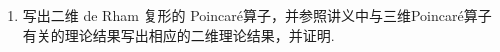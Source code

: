 \begin{enumerate}
\item 写出二维 de Rham 复形的 Poincar\'e算子，并参照讲义中与三维Poincar\'e算子有关的理论结果写出相应的二维理论结果，并证明.
\end{enumerate}

